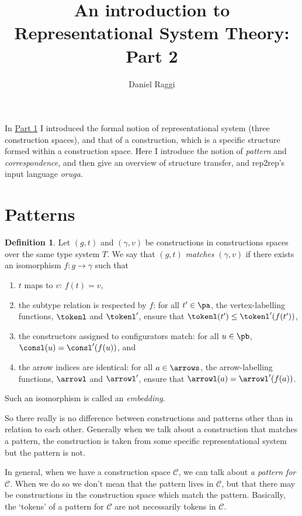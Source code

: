 \documentclass[a4paper]{article}
\title{An introduction to Representational System Theory: Part 2}
\author{Daniel Raggi}
\theoremstyle{definition}
\newtheorem{definition}{Definition}
\begin{document}
	\maketitle
	In \href{https://github.com/danielraggi/rep2rep/blob/59c2d2b0f8759dd034a94a2186b4b5eadae40812/doc/RST-intro-part1.pdf}{Part 1} I introduced the formal notion of representational system (three construction spaces), and that of a construction, which is a specific structure formed within a construction space.
	Here I introduce the notion of \textit{pattern} and \textit{correspondence}, and then give an overview of structure transfer, and rep2rep's input language \textit{oruga}.
	\section{Patterns}
	\begin{definition}
		Let $(g,t)$ and $(\gamma,v)$ be constructions in constructions spaces over the same type system $T$. We say that $(g,t)$ \textit{matches} $(\gamma,v)$ if there exists an isomorphism $f: g \to \gamma$ such that
		\begin{enumerate}[itemsep=1pt]
			\item $t$ maps to $v$: $f(t)=v$,
			\item the subtype relation is respected by $f$: for all $t'\in \pa$, the vertex-labelling functions, $\tokenl$ and $\tokenl'$, ensure that $\tokenl(t')\leq \tokenl'(f(t'))$,
			\item the constructors assigned to configurators match: for all $u\in \pb$, $\consl(u)=\consl'(f(u))$, and
			\item the arrow indices are identical: for all $a\in \arrows$, the arrow-labelling functions, $\arrowl$ and $\arrowl'$, ensure that  $\arrowl(a)=\arrowl'(f(a))$.
		\end{enumerate}
		Such an isomorphism is called an \textit{embedding}.
	\end{definition}
	So there really is no difference between constructions and patterns other than in relation to each other. Generally when we talk about a construction that matches a pattern, the construction is taken from some specific representational system but the pattern is not. 
	
	In general, when we have a construction space $\mathcal{C}$, we can talk about \textit{a pattern for $\mathcal{C}$}. When we do so we don't mean that the pattern lives in $\mathcal{C}$, but that there may be constructions in the construction space which match the pattern. Basically, the `tokens' of a pattern for $\mathcal{C}$ are not necessarily tokens in $\mathcal{C}$.
	
\end{document}
